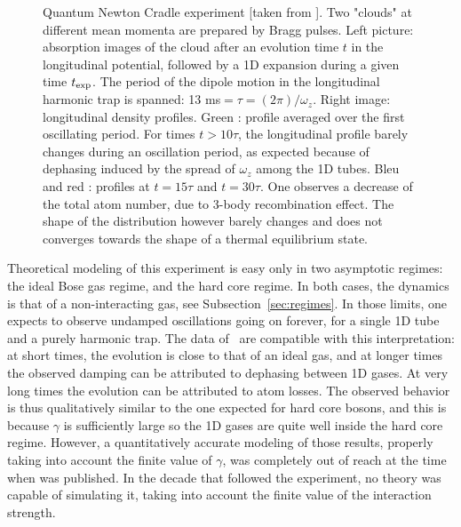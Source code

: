 \documentclass[onecolumn,amsfonts,showpacs,superscriptaddress]{revtex4-1}
\begin{document}
\begin{figure}
{\begin{tabular}{c}
    \end{tabular}}
    \caption{Quantum Newton Cradle experiment [taken from \cite{kinoshita2006quantum}]. Two "clouds" at different mean momenta are prepared by Bragg pulses. Left picture: absorption images of the cloud after an evolution time $t$ in the longitudinal potential, followed by a 1D expansion during a given time $t_{\rm exp}$. The period of the dipole motion in the longitudinal harmonic trap is spanned: 13 ms$=\tau=(2\pi)/\omega_z$. Right image: longitudinal density profiles. Green : profile averaged over the first oscillating period. For times $ t>10\tau$, the longitudinal profile barely changes during an oscillation period, as expected because of dephasing induced by the spread of $\omega_z$ among the 1D tubes. Bleu and red : profiles at $t=15\tau$ and $t=30\tau$. One observes a  decrease of the total atom number, due to 3-body recombination effect. The shape of the distribution however barely changes and does not converges towards the shape of a thermal equilibrium state. }
    \label{fig:NewtonCradleWeiss}
\end{figure}







Theoretical modeling of this experiment is easy only in two asymptotic regimes: the ideal Bose gas regime, and the hard core regime. In both cases, the dynamics is that of a non-interacting gas, see Subsection~\ref{sec:regimes}. In those limits, one expects to observe undamped oscillations going on forever, for a single 1D tube and a purely harmonic trap. The data of~\cite{kinoshita2006quantum} are compatible with this interpretation: at short times, the evolution is close to that of an ideal gas, and at longer times the observed damping can be attributed to dephasing between 1D gases. At very long times the evolution can be attributed to atom losses. 
The observed behavior is thus qualitatively similar to the one expected for hard core bosons, and this is because $\gamma$ is sufficiently large so the 1D gases are quite well inside the hard core regime.
However, a quantitatively accurate modeling of those results, properly taking into account the finite value of $\gamma$, was completely out of reach at the time when \citep{kinoshita2006quantum} was published. In the decade that followed the experiment, no theory was capable of simulating it, taking into account the finite value of the interaction strength.
\end{document}
